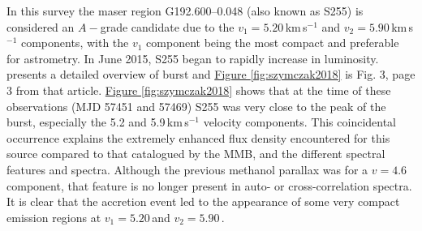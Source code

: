         In this survey the maser region G192.600--0.048 (also known as S255) is considered an $A-$grade candidate due to the $v_1=5.20$\,km\,s$^{-1}$ and $v_2=5.90$\,km\,s$^{-1}$ components, with the $v_1$ component being the most compact and preferable for astrometry.
        In June 2015, S255 began to rapidly increase in luminosity. \citet{Szymczak2018b} presents a detailed overview of burst and \hyperref[fig:szymczak2018]{Figure \ref*{fig:szymczak2018}} is Fig. 3, page 3 from that article. \hyperref[fig:szymczak2018]{Figure \ref*{fig:szymczak2018}} shows that at the time of these observations (MJD 57451 and 57469) S255 was very close to the peak of the burst, especially the 5.2 and 5.9\,km\,s$^{-1}$ velocity components. This coincidental occurrence explains the extremely enhanced flux density encountered for this source compared to that catalogued by the MMB, and the different spectral features and spectra. Although the previous methanol parallax was for a $v=4.6$\,\kms component, that feature is no longer present in auto- or cross-correlation spectra. It is clear that the accretion event led to the appearance of some very compact emission regions at $v_1=5.20$\,\kms and $v_2=5.90$\,\kms.
        
